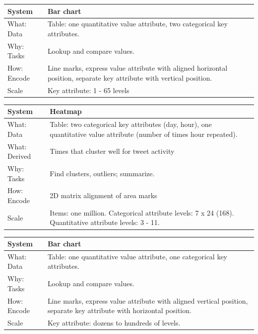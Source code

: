 \documentclass[journal]{vgtc}                %
\begin{document}
\begin{center}
     \label{tab:as} 
    \begin{tabular}{ | l | p{4cm} |}
    \hline
    System   & Bar chart \\ \hline
    What: Data   & Table: one quantitative value attribute, two categorical key attributes. \\ \hline
    Why: Tasks  & Lookup and compare values. \\ \hline
    How: Encode   & Line marks, express value attribute with aligned horizontal position, separate key attribute with vertical position. \\ \hline
    Scale & Key attribute: 1 - 65 levels \\ \hline
    \end{tabular}
\end{center}

\begin{center}
     \label{tab:hm} 
    \begin{tabular}{ | l | p{4cm} |}
    \hline
    System   & Heatmap \\ \hline
    What: Data   & Table: two categorical key attributes (day, hour), one quantitative value attribute (number of times hour repeated). \\ \hline
    What: Derived   & Times that cluster well for tweet activity \\ \hline
    Why: Tasks  & Find clusters, outliers; summarize. \\ \hline
    How: Encode   & 2D matrix alignment of area marks \\ \hline
    Scale  & Items: one million. Categorical attribute levels: 7 x 24 (168). Quantitative attribute levels: 3 - 11. \\ \hline
    \end{tabular}
\end{center}

\begin{center}
     \label{tab:st} 
    \begin{tabular}{ | l | p{4cm} |}
    \hline
    System   & Bar chart \\ \hline
    What: Data   & Table: one quantitative value attribute, one categorical key attributes. \\ \hline
    Why: Tasks  & Lookup and compare values. \\ \hline
    How: Encode   & Line marks, express value attribute with aligned vertical position, separate key attribute with horizontal position. \\ \hline
    Scale & Key attribute: dozens to hundreds of levels. \\ \hline
    \end{tabular}
\end{center}
\end{document}
